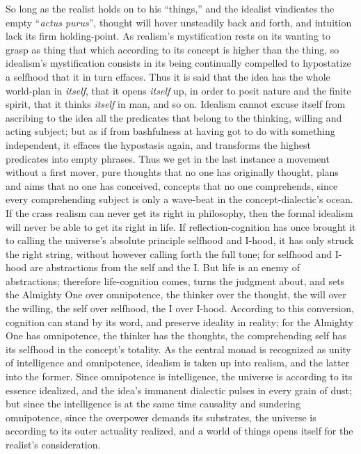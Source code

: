 \documentclass[12pt]{book}
\begin{document}
So long as the realist holds on to his ``things,'' and the idealist
vindicates the empty ``\textit{actus purus}'', thought will hover unsteadily
back and forth, and intuition lack its firm holding-point. As realism's
mystification rests on its wanting to grasp as thing that which according to
its concept is higher than the thing, so idealism's mystification consists
in its being continually compelled to hypostatize a selfhood that it in turn
effaces. Thus it is said that the idea has the whole world-plan in \emph{itself},
that it opens \emph{itself} up, in order to posit nature and
the finite spirit, that it thinks \emph{itself} in man, and so on. Idealism
cannot excuse itself from ascribing to the idea all the predicates that
belong to the thinking, willing and acting subject; but as if from
bashfulness at having got to do with something independent, it effaces the
hypostasis again, and transforms the highest predicates into empty phrases.
Thus we get in the last instance a movement without a first mover, pure
thoughts that no one has originally thought, plans and aims that no one has
conceived, concepts that no one comprehends, since every comprehending
subject is only a wave-beat in the concept-dialectic's ocean. If the crass
realism can never get its right in philosophy, then the formal idealism will
never be able to get its right in life. If reflection-cognition has once
brought it to calling the universe's absolute principle selfhood and I-hood,
it has only struck the right string, without however calling forth the full
tone; for selfhood and I-hood are abstractions from the self and the I. But
life is an enemy of abstractions; therefore life-cognition comes, turns the
judgment about, and sets the Almighty One over omnipotence, the thinker over
the thought, the will over the willing, the self over selfhood, the I over
I-hood. According to this conversion, cognition can stand by its word, and
preserve ideality in reality; for the Almighty One has omnipotence, the
thinker has the thoughts, the comprehending self has its selfhood in the
concept's totality. As the central monad is recognized as unity of
intelligence and omnipotence, idealism is taken up into realism, and the
latter into the former. Since omnipotence is intelligence, the universe is
according to its essence idealized, and the idea's immanent dialectic pulses
in every grain of dust; but since the intelligence is at the same time
causality and sundering omnipotence, since the overpower demands its
substrates, the universe is according to its outer actuality realized, and a
world of things opens itself for the realist's consideration.
\end{document}
